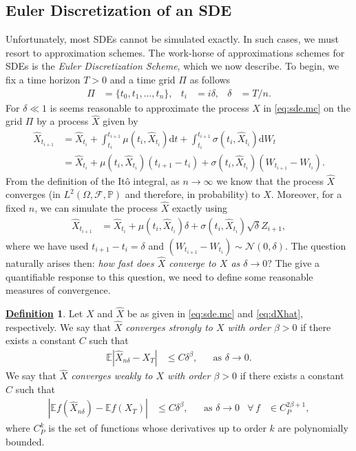 \documentclass[12pt]{book}
\numberwithin{equation}{chapter}
\theoremstyle{plain}
\numberwithin{theorem}{section}
\theoremstyle{definition}
\newtheorem{definition}[theorem]{\underline{Definition}}
\numberwithin{exercise}{chapter}
\newcommand{\<}{\langle}
\renewcommand{\>}{\rangle}
\renewcommand{\(}{\left(}
\renewcommand{\)}{\right)}
\renewcommand{\[}{\left[}
\renewcommand{\]}{\right]}
\newcommand\Eb{\mathds{E}}
\newcommand\Pb{\mathds{P}}
\newcommand\Fc{\mathscr{F}}
\newcommand\Nc{\mathscr{N}}
\newcommand\Om{\Omega}
\newcommand\sig{\sigma}
\newcommand\del{\delta}
\newcommand\Xh{\widehat{X}}
\newcommand\dd{\mathrm{d}}
\begin{document}
\subsection{Euler Discretization of an SDE}
\label{sec:euler}
Unfortunately, most SDEs cannot be simulated exactly.  In such cases, we must resort to approximation schemes.  The work-horse of approximations schemes for SDEs is the \emph{Euler Discretization Scheme}, which we now describe.  To begin, we fix a time horizon $T>0$ and a time grid $\Pi$ as follows
\begin{align}
\Pi
	&=	\{ t_0, t_1, \ldots, t_n \} , &
t_i
	&=	i \del , &
\del
	&=	T/n . \label{eq:time.grid}
\end{align}
For $\del \ll 1$ is seems reasonable to approximate the process $X$ in \eqref{eq:sde.mc} on the grid $\Pi$ by a process $\Xh$ given by
\begin{align}
\Xh_{t_{i+1}}
	&=	\Xh_{t_i} + \int_{t_i}^{t_{i+1}} \mu(t_i,\Xh_{t_i}) \dd t + \int_{t_i}^{t_{i+1}} \sig(t_i,\Xh_{t_i}) \dd W_t \\
	&=	\Xh_{t_i} + \mu(t_i,\Xh_{t_i}) \( t_{i+1} - t_i \)  + \sig(t_i,\Xh_{t_i}) \( W_{t_{i+1}} - W_{t_i} \) . \label{eq:dXhat}
\end{align}
From the definition of the It\^o integral, as $n \to \infty$ we know that the process $\Xh$ converges (in $L^2(\Om,\Fc,\Pb)$ and therefore, in probability) to $X$.  Moreover, for a fixed $n$, we can simulate the process $\Xh$ exactly using
\begin{align}
\Xh_{t_{i+1}}
	&=	\Xh_{t_i} + \mu(t_i,\Xh_{t_i}) \del  + \sig(t_i,\Xh_{t_i}) \sqrt{\del} Z_{i+1} ,
\end{align}
where we have used $t_{i+1}-t_i=\del$ and  $\( W_{t_{i+1}} - W_{t_i} \) \sim \Nc(0,\del)$.  The question naturally arises then: \emph{how fast does $\Xh$ converge to $X$ as $\del \to 0$}?  The give a quantifiable response to this question, we need to define some reasonable measures of convergence.
\begin{definition}
Let $X$ and $\Xh$ be as given in \eqref{eq:sde.mc} and \eqref{eq:dXhat}, respectively.
We say that \emph{$\Xh$ converges strongly to $X$ with order $\beta>0$} if there exists a constant $C$ such that
\begin{align}
\Eb | \Xh_{n\del} - X_T |
	&\leq	C \del^\beta , &
	&\text{as $\del \to 0$}. \label{eq:strong.order}
\end{align}
We say that \emph{$\Xh$ converges weakly to $X$ with order $\beta>0$} if there exists a constant $C$ such that
\begin{align}
| \Eb f(\Xh_{n\del}) - \Eb f(X_T) |
	&\leq	C \del^\beta , &
	&\text{as $\del \to 0$} &
\forall \, f
	&\in	C_P^{2\beta+1} , \label{eq:weak.order}
\end{align}
where $C_P^k$ is the set of functions whose derivatives up to order $k$ are polynomially bounded.
\end{definition}
\end{document}

